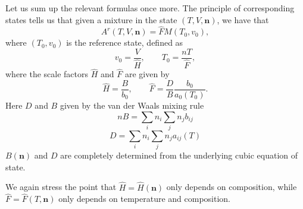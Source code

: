 \documentclass[internal,english]{sintefmemo2012}
\newcommand{\mbn}[0]{\mathbf n}
\newcommand*{\hF}[0]{\hat F}
\newcommand*{\hH}[0]{\hat H}
\numberwithin{equation}{section}
\begin{document}
Let us sum up the relevant formulas once more. The principle of
corresponding states tells us that given a mixture in the state
$(T,V,\mbn)$, we have that
\begin{equation}
  A^r(T,V,\mbn) = \hat F M(T_0,v_0),
\end{equation}
where $(T_0,v_0)$ is the reference state, defined as
\begin{equation}
  v_0 = \frac{V}{\hat H}, \qquad T_0 = \frac{nT}{\hat F},
\end{equation}
where the scale factors $\hat H$ and $\hat F$ are given by
\begin{equation}
  \hat H = \frac{B}{b_0}, \qquad \hat F = \frac{D}{B} \frac{b_0}{a_0(T_0)}.
\end{equation}
Here $D$ and $B$ given by the van der Waals mixing rule
\begin{equation}
  nB = \sum_{i} n_i \sum_j n_j b_{ij}
\end{equation}
\begin{equation}
  D = \sum_{i} n_i \sum_j n_j a_{ij}(T)
\end{equation}
$B(\mbn)$ and $D$ are completely determined from the underlying cubic
equation of state.

We again stress the point that $\hH = \hH(\mbn)$ only depends on
composition, while $\hF = \hF(T,\mbn)$ only depends on temperature and
composition.
\end{document}
